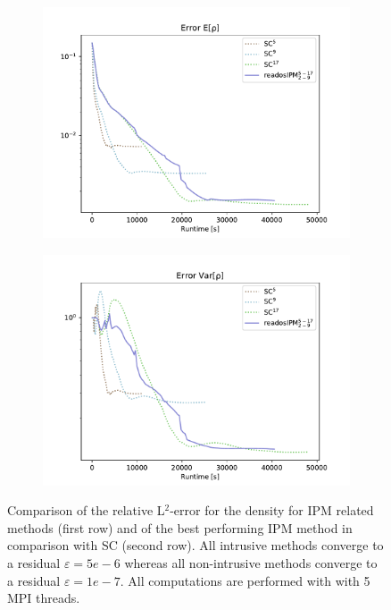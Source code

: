 \begin{figure}[h!]
	\begin{subfigure}{0.5\linewidth}
		\centering
				\includegraphics[scale=0.55]{figs/errorEuler/L2_error_E[rho]_sc.pdf}
		\caption{}
		\label{fig:sub33}
	\end{subfigure}%
	\begin{subfigure}{0.5\linewidth}
		\centering
				\includegraphics[scale=0.55]{figs/errorEuler/L2_error_Var[rho]_sc.pdf}
		\caption{}
		\label{fig:sub34}
	\end{subfigure}
	\caption{Comparison of the relative L$^2$-error for the density for IPM related methods (first row) and of the best performing IPM method in comparison with SC (second row). All intrusive methods converge to a residual $\varepsilon=5e-6$ whereas all non-intrusive methods converge to a residual $\varepsilon=1e-7$. All computations are performed with with 5 MPI threads.}
	\label{fig:L2ErrorSolution}
\end{figure}
